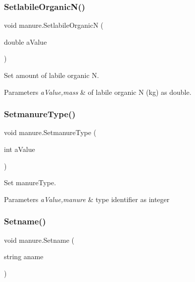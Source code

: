 \subsubsection{\texorpdfstring{SetlabileOrganicN()}{SetlabileOrganicN()}}
{\footnotesize\ttfamily void manure.\+Setlabile\+OrganicN (\begin{DoxyParamCaption}\item[{double}]{a\+Value }\end{DoxyParamCaption})\hspace{0.3cm}{\ttfamily [inline]}}



Set amount of labile organic N. 


\begin{DoxyParams}{Parameters}
{\em a\+Value,mass} & of labile organic N (kg) as double. \\
\hline
\end{DoxyParams}
\mbox{\label{classmanure_a26e535fe83dcbe7265e6c7c235ac2b90}} 
\subsubsection{\texorpdfstring{SetmanureType()}{SetmanureType()}}
{\footnotesize\ttfamily void manure.\+Setmanure\+Type (\begin{DoxyParamCaption}\item[{int}]{a\+Value }\end{DoxyParamCaption})\hspace{0.3cm}{\ttfamily [inline]}}



Set manure\+Type. 


\begin{DoxyParams}{Parameters}
{\em a\+Value,manure} & type identifier as integer \\
\hline
\end{DoxyParams}
\mbox{\label{classmanure_a08832556f75468f91453b8ee5f855abc}} 
\subsubsection{\texorpdfstring{Setname()}{Setname()}}
{\footnotesize\ttfamily void manure.\+Setname (\begin{DoxyParamCaption}\item[{string}]{aname }\end{DoxyParamCaption})\hspace{0.3cm}{\ttfamily [inline]}}



